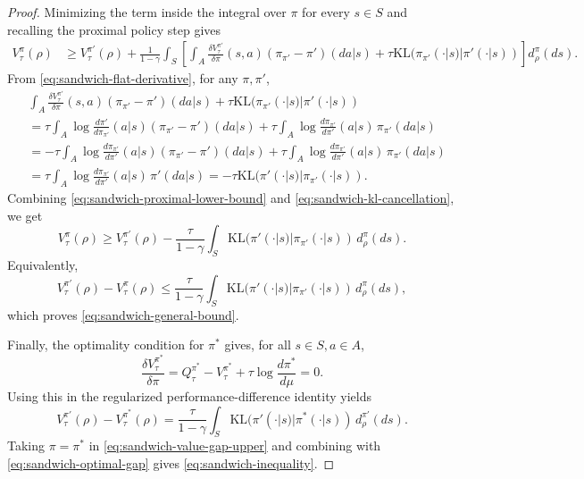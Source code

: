 \documentclass[10pt,a4paper]{amsart}
\begin{document}
\begin{proof}
Minimizing the term inside the integral over $\pi$ for every $s\in S$ and
recalling the proximal policy step gives
\begin{align}
V_\tau^\pi(\rho)
&\ge
V_\tau^{\pi'}(\rho)
+
\frac{1}{1-\gamma}
\int_S
\left[
\int_A
\frac{\delta V_\tau^{\pi'}}{\delta \pi}(s,a)
(\pi_{\pi'}-\pi')(da| s)
+
\tau \mathrm{KL}(\pi_{\pi'}(\cdot | s)| \pi'(\cdot | s))
\right]
d_\rho^\pi(ds).
\label{eq:sandwich-proximal-lower-bound}
\end{align}
From \eqref{eq:sandwich-flat-derivative}, for any $\pi,\pi'$,
\begin{align}
&\int_A
\frac{\delta V_\tau^{\pi'}}{\delta \pi}(s,a)
(\pi_{\pi'}-\pi')(da| s)
+
\tau \mathrm{KL}(\pi_{\pi'}(\cdot | s)| \pi'(\cdot | s))
\nonumber \\
&=
\tau
\int_A
\log \frac{d\pi'}{d\pi_{\pi'}}(a|s)
(\pi_{\pi'}-\pi')(da| s)
+
\tau
\int_A
\log \frac{d\pi_{\pi'}}{d\pi'}(a|s)
\,\pi_{\pi'}(da| s)
\nonumber \\
&=
-\tau
\int_A
\log \frac{d\pi_{\pi'}}{d\pi'}(a|s)
(\pi_{\pi'}-\pi')(da| s)
+
\tau
\int_A
\log \frac{d\pi_{\pi'}}{d\pi'}(a|s)
\,\pi_{\pi'}(da| s)
\nonumber \\
&=
\tau
\int_A
\log \frac{d\pi_{\pi'}}{d\pi'}(a|s)
\,\pi'(da| s)
=
-\tau \mathrm{KL}(\pi'(\cdot | s)| \pi_{\pi'}(\cdot |s)).
\label{eq:sandwich-kl-cancellation}
\end{align}
Combining \eqref{eq:sandwich-proximal-lower-bound} and
\eqref{eq:sandwich-kl-cancellation}, we get
\begin{equation}
V_\tau^\pi(\rho)
\ge
V_\tau^{\pi'}(\rho)
-
\frac{\tau}{1-\gamma}
\int_S
\mathrm{KL}(\pi'(\cdot | s)| \pi_{\pi'}(\cdot |s))
\,d_\rho^\pi(ds).
\label{eq:sandwich-lower-bound}
\end{equation}
Equivalently,
\begin{equation}
V_\tau^{\pi'}(\rho)-V_\tau^\pi(\rho)
\le
\frac{\tau}{1-\gamma}
\int_S
\mathrm{KL}(\pi'(\cdot | s)| \pi_{\pi'}(\cdot |s))
\,d_\rho^\pi(ds),
\label{eq:sandwich-value-gap-upper}
\end{equation}
which proves \eqref{eq:sandwich-general-bound}.

Finally, the optimality condition for $\pi^*$ gives, for all $s \in S,a \in A$,
\begin{equation}
\frac{\delta V_\tau^{\pi^*}}{\delta \pi}
=
Q_\tau^{\pi^*}
-
V_\tau^{\pi^*}
+
\tau \log \frac{d\pi^*}{d\mu}
=
0.
\label{eq:sandwich-optimality-condition}
\end{equation}
Using this in the regularized performance-difference identity yields
\begin{equation}
V_\tau^{\pi'}(\rho)-V_\tau^{\pi^*}(\rho)
=
\frac{\tau}{1-\gamma}
\int_S
\mathrm{KL}(\pi'(\cdot |s)| \pi^*(\cdot | s))
\,d_\rho^{\pi'}(ds).
\label{eq:sandwich-optimal-gap}
\end{equation}
Taking $\pi=\pi^*$ in \eqref{eq:sandwich-value-gap-upper} and combining with
\eqref{eq:sandwich-optimal-gap} gives
\eqref{eq:sandwich-inequality}.
\end{proof}
\end{document}
